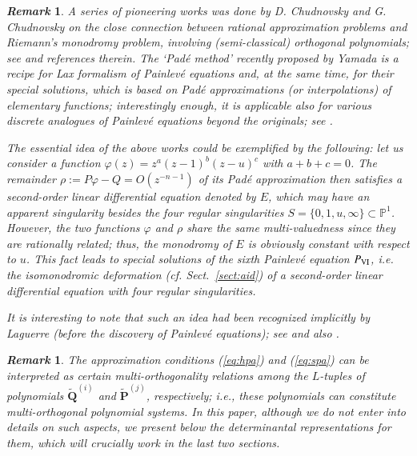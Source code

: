 \documentclass[12pt]{article}
\newtheorem{remark}[thm]{\it Remark}
\numberwithin{equation}{section}
\begin{document}
\begin{remark} \rm
\label{remark:history}
A series of pioneering works
was done by  D. Chudnovsky and  G. Chudnovsky 
on
the close connection between 
rational approximation problems 
and Riemann's monodromy problem,
involving (semi-classical) orthogonal polynomials;
see \cite{cc82, cc94} and references therein. 
The `Pad\'e method'  recently
proposed by Yamada \cite{yam09}
is a recipe for Lax  formalism
of Painlev\'e equations and, at the same time,
for their special solutions,
which is based on
Pad\'e approximations (or interpolations) of
elementary functions;
interestingly enough,
it is applicable also for various discrete analogues of 
Painlev\'e equations beyond the originals;
see 
\cite{ika13, nag15, nty12}.



The essential idea of the above works could be exemplified by the  
following:
let us consider a function
$\varphi(z)= z^a(z-1)^b(z-u)^c$
with $a+b+c=0$.
The remainder 
$\rho:=P \varphi -Q =O(z^{-n-1})$
of its 
Pad\'e approximation
then satisfies
a second-order linear differential equation
denoted by $E$,
which may have 
an apparent singularity besides the
four regular singularities $S=\{0,1,u,\infty\} \subset {\mathbb P}^1$.
However, the two functions $\varphi$ and $\rho$
share the same multi-valuedness
since they are rationally related;
thus, the monodromy of $E$ 
is obviously constant with respect to $u$.
This fact
leads to special solutions of 
the sixth Painlev\'e equation $P_{\rm VI}$,
i.e. the {\it isomonodromic deformation}
(cf. Sect.~\ref{sect:aid})
 of a
second-order linear differential equation
with four regular singularities. 


It is interesting to note that
such an idea had been recognized
implicitly by Laguerre
(before the discovery of Painlev\'e equations);
see \cite{lag80} and also \cite{mag95}.
\end{remark}





\begin{remark}\rm
The approximation conditions (\ref{eq:hpa}) and (\ref{eq:spa})
can be interpreted as certain
multi-orthogonality relations among the $L$-tuples of 
polynomials 
$\widetilde{\boldsymbol Q}^{(i)}$
and
$\widetilde{\boldsymbol P}^{(j)}$,
respectively;
i.e., these polynomials
can constitute multi-orthogonal polynomial systems.
In this paper,
although we do not enter into details on such aspects, 
we present below 
the {\it determinantal representations} for them,
which will crucially work in the last two sections.
\end{remark}
\end{document}
